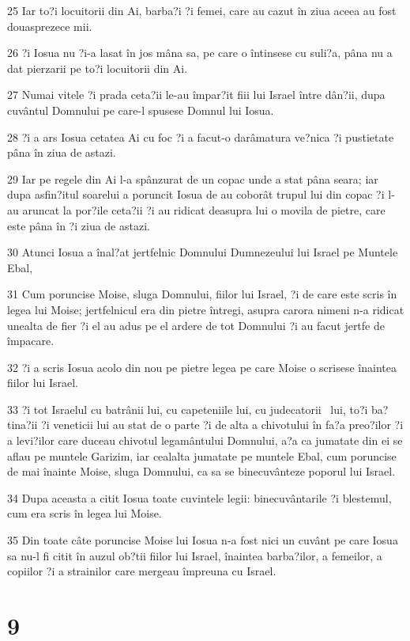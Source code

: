 \par 25 Iar to?i locuitorii din Ai, barba?i ?i femei, care au cazut în ziua aceea au fost douasprezece mii.
\par 26 ?i Iosua nu ?i-a lasat în jos mâna sa, pe care o întinsese cu suli?a, pâna nu a dat pierzarii pe to?i locuitorii din Ai.
\par 27 Numai vitele ?i prada ceta?ii le-au împar?it fiii lui Israel între dân?ii, dupa cuvântul Domnului pe care-l spusese Domnul lui Iosua.
\par 28 ?i a ars Iosua cetatea Ai cu foc ?i a facut-o darâmatura ve?nica ?i pustietate pâna în ziua de astazi.
\par 29 Iar pe regele din Ai l-a spânzurat de un copac unde a stat pâna seara; iar dupa asfin?itul soarelui a poruncit Iosua de au coborât trupul lui din copac ?i l-au aruncat la por?ile ceta?ii ?i au ridicat deasupra lui o movila de pietre, care este pâna în ?i ziua de astazi.
\par 30 Atunci Iosua a înal?at jertfelnic Domnului Dumnezeului lui Israel pe Muntele Ebal,
\par 31 Cum poruncise Moise, sluga Domnului, fiilor lui Israel, ?i de care este scris în legea lui Moise; jertfelnicul era din pietre întregi, asupra carora nimeni n-a ridicat unealta de fier ?i el au adus pe el ardere de tot Domnului ?i au facut jertfe de împacare.
\par 32 ?i a scris Iosua acolo din nou pe pietre legea pe care Moise o scrisese înaintea fiilor lui Israel.
\par 33 ?i tot Israelul cu batrânii lui, cu capeteniile lui, cu judecatorii  lui, to?i ba?tina?ii ?i veneticii lui au stat de o parte ?i de alta a chivotului în fa?a preo?ilor ?i a levi?ilor care duceau chivotul legamântului Domnului, a?a ca jumatate din ei se aflau pe muntele Garizim, iar cealalta jumatate pe muntele Ebal, cum poruncise de mai înainte Moise, sluga Domnului, ca sa se binecuvânteze poporul lui Israel.
\par 34 Dupa aceasta a citit Iosua toate cuvintele legii: binecuvântarile ?i blestemul, cum era scris în legea lui Moise.
\par 35 Din toate câte poruncise Moise lui Iosua n-a fost nici un cuvânt pe care Iosua sa nu-l fi citit în auzul ob?tii fiilor lui Israel, înaintea barba?ilor, a femeilor, a copiilor ?i a strainilor care mergeau împreuna cu Israel.

\chapter{9}

